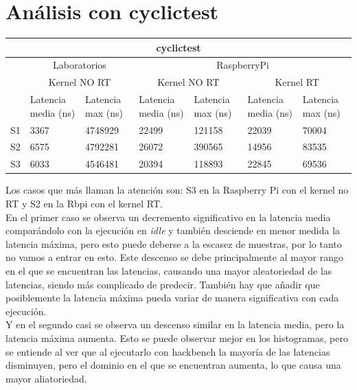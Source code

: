 \documentclass[12pt, a4paper]{report}
\begin{document}
	\chapter*{Análisis con cyclictest}
	\begin{center}
		\setlength\extrarowheight{4pt}
		\begin{tabular}{ |p{1cm}|p{2cm}|p{2cm}|p{2cm}|p{2cm}|p{2cm}|p{2cm}| } 
			\hline
			\multicolumn{7}{|c|}{\textbf{cyclictest}}\\ 
			\hline
			& \multicolumn{2}{|c|}{Laboratorios} & \multicolumn{4}{|c|}{RaspberryPi}\\ 
			\cline{2-7}
		 	& \multicolumn{2}{|c|}{Kernel NO RT} & \multicolumn{2}{|c|}{Kernel NO RT} & \multicolumn{2}{|c|}{Kernel RT}\\ 
			\cline{2-7}
		 	 & Latencia media (ns) & Latencia max (ns)& Latencia media (ns) & Latencia max (ns)& Latencia media (ns) & Latencia max (ns)\\ 
			\hline
		 	 S1 & 3367 & 4748929& 22499& 121158& 22039&70004\\ 
			\hline
		 	 S2 & 6575 & 4792281& 26072& 390565& 14956&83535\\ 
			\hline
		 	 S3 & 6033 & 4546481& 20394& 118893& 22845&69536\\ 
			\hline
		\end{tabular}
	\end{center}
	Los casos que más llaman la atención son: S3 en la Raspberry Pi con el kernel no RT y S2 en la Rbpi con el kernel RT.\\
	\newline
	En el primer caso se observa un decremento significativo en la latencia media comparándolo con la ejecución en \textit{idle} y también desciende en menor medida la latencia máxima, pero esto puede deberse a la escasez de muestras, por lo tanto no vamos a entrar en esto. Este descenso se debe principalmente al mayor rango en el que se encuentran las latencias, causando una mayor aleatoriedad de las latencias, siendo más complicado de predecir. También hay que añadir que posiblemente la latencia máxima pueda variar de manera significativa con cada ejecución.\\
	\newline
	Y en el segundo casi se observa un descenso similar en la latencia media, pero la latencia máxima aumenta. Esto se puede observar mejor en los histogramas, pero se entiende al ver que al ejecutarlo con hackbench la mayoría de las latencias disminuyen, pero el dominio en el que se encuentran aumenta, lo que causa una mayor aliatoriedad. 
\end{document}
